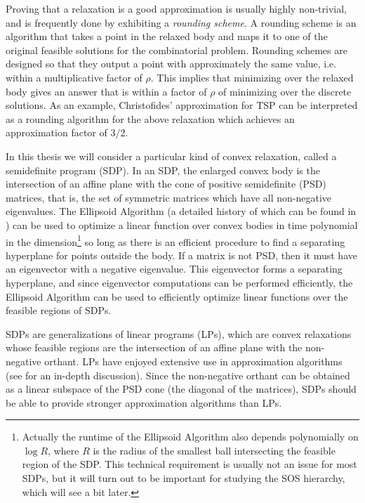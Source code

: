 Proving that a relaxation is a good approximation is usually highly non-trivial, and is frequently done by exhibiting a \emph{rounding scheme}. A rounding scheme is an  algorithm that takes a point in the relaxed body and maps it to one of the original feasible solutions for the combinatorial problem. Rounding schemes are designed so that they output a point with approximately the same value, i.e. within a multiplicative factor of $\rho$. This implies that minimizing over the relaxed body gives an answer that is within a factor of $\rho$ of minimizing over the discrete solutions. As an example, Christofides' approximation for \textsc{TSP} \cite{Chri76} can be interpreted as a rounding algorithm for the above relaxation which achieves an approximation factor of $3/2$.

In this thesis we will consider a particular kind of convex relaxation, called a semidefinite program (SDP). In an SDP, the enlarged convex body is the intersection of an affine plane with the cone of positive semidefinite (PSD) matrices, that is, the set of symmetric matrices which have all non-negative eigenvalues. The Ellipsoid Algorithm (a detailed history of which can be found in \cite{Akg84}) can be used to optimize a linear function over convex bodies in time polynomial in the dimension\footnote{Actually the runtime of the Ellipsoid Algorithm also depends polynomially on $\log R$, where $R$ is the radius of the smallest ball intersecting the feasible region of the SDP. This technical requirement is usually not an issue for most SDPs, but it will turn out to be important for studying the SOS hierarchy, which will see a bit later.} so long as there is an efficient procedure to find a separating hyperplane for points outside the body. If a matrix is not PSD, then it must have an eigenvector with a negative eigenvalue. This eigenvector forms a separating hyperplane, and since eigenvector computations can be performed efficiently, the Ellipsoid Algorithm can be used to efficiently optimize linear functions over the feasible regions of SDPs. 

SDPs are generalizations of linear programs (LPs), which are convex relaxations whose feasible regions are the intersection of an affine plane with the non-negative orthant. LPs have enjoyed extensive use in approximation algorithms (see \cite{WSbook11} for an in-depth discussion). Since the non-negative orthant can be obtained as a linear subspace of the PSD cone (the diagonal of the matrices), SDPs should be able to provide stronger approximation algorithms than LPs. 

